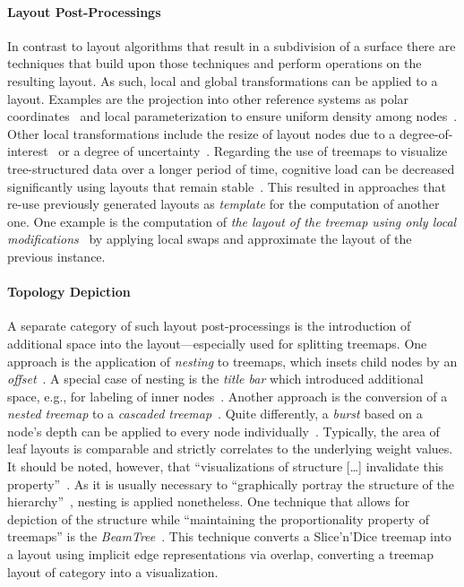 \documentclass[sigconf%
,natbib=true%
]{acmart}
\begin{document}
\paragraph{\textbf{Layout Post-Processings}}
In contrast to layout algorithms that result in a subdivision of a surface there are techniques that build upon those techniques and perform operations on the resulting layout.
As such, local and global transformations can be applied to a layout.
Examples are the projection into other reference systems as polar coordinates~\cite{johnson1993-categorical} and local parameterization to ensure uniform density among nodes~\cite{vliegen2006-businessdata}.
Other local transformations include the resize of layout nodes due to a degree-of-interest~\cite{shi2007-distortion} or a degree of uncertainty~\cite{sondag2020-uncertainty}.
Regarding the use of treemaps to visualize tree-structured data over a longer period of time, cognitive load can be decreased significantly using layouts that remain stable~\cite{misue1995-mentalmap}.
This resulted in approaches that re-use previously generated layouts as \emph{template} for the computation of another one.
One example is the computation of \emph{the layout of the treemap using only local modifications}~\cite{sondag2017-stabletreemaps} by applying local swaps and approximate the layout of the previous instance.

\paragraph{\textbf{Topology Depiction}}
A separate category of such layout post-processings is the introduction of additional space into the layout---especially used for splitting treemaps.
One approach is the application of \emph{nesting} to treemaps, which insets child nodes by an \emph{offset}~\cite{johnson1991-spacefilling}.
A special case of nesting is the \emph{title bar} which introduced additional space, e.g., for labeling of inner nodes~\cite{turo1992-improve}.
Another approach is the conversion of a \emph{nested treemap} to a \emph{cascaded treemap}~\cite{lu2008-cascadedtreemaps}.
Quite differently, a \emph{burst} based on a node's depth can be applied to every node individually~\cite{schreck2006-regular}.
Typically, the area of leaf layouts is comparable and strictly correlates to the underlying weight values.
It should be noted, however, that \enquote{visualizations of structure [\ldots] invalidate this property}~\cite{lu2008-cascadedtreemaps}.
As it is usually necessary to \enquote{graphically portray the structure of the hierarchy}~\cite{johnson1993-categorical}, nesting is applied nonetheless.
One technique that allows for depiction of the structure while \enquote{maintaining the proportionality property of treemaps} is the \emph{BeamTree}~\cite{vanHam2003-beamtrees}.
This technique converts a Slice'n'Dice treemap into a layout using implicit edge representations via overlap, converting a treemap layout of category \Ts{} into a \Tie{} visualization.
\end{document}
